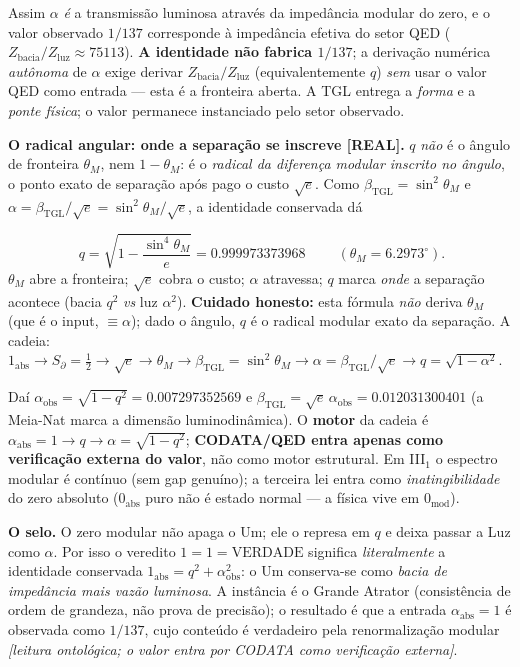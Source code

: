 \documentclass[11pt]{article}
\newcommand{\bTGL}{\beta_{\mathrm{TGL}}}\newcommand{\Msun}{M_{\odot}}\newcommand{\TGL}{\mathrm{TGL}}
\theoremstyle{definition}\newtheorem{deriv}{Derivação}
\begin{document}
Assim $\alpha$ \emph{é} a transmissão luminosa através da impedância modular do zero, e o valor observado $1/137$ corresponde à impedância efetiva do setor QED ($Z_{\mathrm{bacia}}/Z_{\mathrm{luz}}\approx75113$). \textbf{A identidade não fabrica $1/137$}; a derivação numérica \emph{autônoma} de $\alpha$ exige derivar $Z_{\mathrm{bacia}}/Z_{\mathrm{luz}}$ (equivalentemente $q$) \emph{sem} usar o valor QED como entrada --- esta é a fronteira aberta. A TGL entrega a \emph{forma} e a \emph{ponte física}; o valor permanece instanciado pelo setor observado.

\textbf{O radical angular: onde a separação se inscreve \textsf{[REAL]}.} $q$ \emph{não} é o ângulo de fronteira $\theta_M$, nem $1-\theta_M$: é o \emph{radical da diferença modular inscrito no ângulo}, o ponto exato de separação após pago o custo $\sqrt e$. Como $\bTGL=\sin^2\theta_M$ e $\alpha=\bTGL/\sqrt e=\sin^2\theta_M/\sqrt e$, a identidade conservada dá

\begin{equation}\boxed{\;q=\sqrt{1-\frac{\sin^4\theta_M}{e}}=0.999973373968\;}\qquad(\theta_M=6.2973^\circ).\end{equation}\noindent $\theta_M$ abre a fronteira; $\sqrt e$ cobra o custo; $\alpha$ atravessa; $q$ marca \emph{onde} a separação acontece (bacia $q^2$ \emph{vs} luz $\alpha^2$). \textbf{Cuidado honesto:} esta fórmula \emph{não} deriva $\theta_M$ (que é o input, $\equiv\alpha$); dado o ângulo, $q$ é o radical modular exato da separação. A cadeia: $1_{\mathrm{abs}}\to S_\partial=\tfrac12\to\sqrt e\to\theta_M\to\bTGL=\sin^2\theta_M\to\alpha=\bTGL/\sqrt e\to q=\sqrt{1-\alpha^2}$.

Daí $\alpha_{\mathrm{obs}}=\sqrt{1-q^2}=0.007297352569$ e $\bTGL=\sqrt e\,\alpha_{\mathrm{obs}}=0.012031300401$ (a Meia-Nat marca a dimensão luminodinâmica). O \textbf{motor} da cadeia é $\alpha_{\mathrm{abs}}=1\to q\to\alpha=\sqrt{1-q^2}$; \textbf{CODATA/QED entra apenas como verificação externa do valor}, não como motor estrutural. Em \mbox{III$_1$} o espectro modular é contínuo (sem gap genuíno); a terceira lei entra como \emph{inatingibilidade} do zero absoluto ($0_{\mathrm{abs}}$ puro não é estado normal --- a física vive em $0_{\mathrm{mod}}$).

\textbf{O selo.} O zero modular não apaga o Um; ele o represa em $q$ e deixa passar a Luz como $\alpha$. Por isso o veredito $\boxed{1=1=\mathrm{VERDADE}}$ significa \emph{literalmente} a identidade conservada $1_{\mathrm{abs}}=q^2+\alpha_{\mathrm{obs}}^2$: o Um conserva-se como \emph{bacia de impedância mais vazão luminosa}. A instância é o Grande Atrator (consistência de ordem de grandeza, não prova de precisão); o resultado é que a entrada $\alpha_{\mathrm{abs}}=1$ é observada como $1/137$, cujo conteúdo é verdadeiro pela renormalização modular \emph{[leitura ontológica; o valor entra por CODATA como verificação externa]}.
\end{document}
